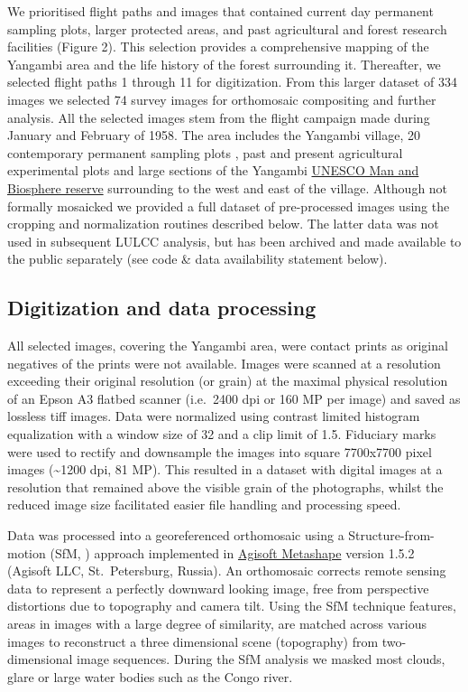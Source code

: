 \documentclass[remote sensing,article,submit,moreauthors,pdftex]{mdpi}
\begin{document}
We prioritised flight paths and images that contained current day
permanent sampling plots, larger protected areas, and past agricultural
and forest research facilities (Figure 2). This selection provides a
comprehensive mapping of the Yangambi area and the life history of the
forest surrounding it. Thereafter, we selected flight paths 1 through 11
for digitization. From this larger dataset of 334 images we selected 74
survey images for orthomosaic compositing and further analysis. All the
selected images stem from the flight campaign made during January and
February of 1958. The area includes the Yangambi village, 20
contemporary permanent sampling plots \citep{Kearsley2013}, past and
present agricultural experimental plots \citep{bauters2015} and large
sections of the Yangambi
\href{http://www.unesco.org/new/en/natural-sciences/environment/ecological-sciences/biosphere-reserves/africa/democratic-republic-of-the-congo/yangambi/}{UNESCO
Man and Biosphere reserve} surrounding to the west and east of the
village. Although not formally mosaicked we provided a full dataset of
pre-processed images using the cropping and normalization routines
described below. The latter data was not used in subsequent LULCC
analysis, but has been archived and made available to the public
separately (see code \& data availability statement below).

\hypertarget{digitization-and-data-processing}{%
\subsection{Digitization and data
processing}\label{digitization-and-data-processing}}

All selected images, covering the Yangambi area, were contact prints as
original negatives of the prints were not available. Images were scanned
at a resolution exceeding their original resolution (or grain) at the
maximal physical resolution of an Epson A3 flatbed scanner (i.e.~2400
dpi or 160 MP per image) and saved as lossless tiff images. Data were
normalized using contrast limited histogram equalization
\citep{zuiderveld1994} with a window size of 32 and a clip limit of 1.5.
Fiduciary marks were used to rectify and downsample the images into
square 7700x7700 pixel images (\textasciitilde{}1200 dpi, 81 MP). This
resulted in a dataset with digital images at a resolution that remained
above the visible grain of the photographs, whilst the reduced image
size facilitated easier file handling and processing speed.

Data was processed into a georeferenced orthomosaic using a
Structure-from-motion (SfM, \citet{ullman1979}) approach implemented in
\href{http://www.agisoft.com}{Agisoft Metashape} version 1.5.2 (Agisoft
LLC, St.~Petersburg, Russia). An orthomosaic corrects remote sensing
data to represent a perfectly downward looking image, free from
perspective distortions due to topography and camera tilt. Using the SfM
technique features, areas in images with a large degree of similarity,
are matched across various images to reconstruct a three dimensional
scene (topography) from two-dimensional image sequences. During the SfM
analysis we masked most clouds, glare or large water bodies such as the
Congo river.
\end{document}
